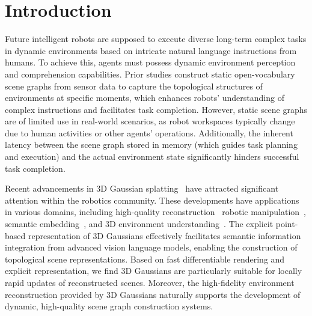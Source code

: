 \section{Introduction}  \label{sec:intro}

Future intelligent robots are supposed to execute diverse long-term complex tasks in dynamic environments based on intricate natural language instructions from humans. To achieve this, agents must possess dynamic environment perception and comprehension capabilities. Prior studies \cite{gu2023conceptgraphsopenvocabulary3dscene, werby23hovsg, yan2025dynamicopenvocabulary3dscene, linok2024barequeriesopenvocabularyobject} construct static open-vocabulary scene graphs from sensor data to capture the topological structures of environments at specific moments, which enhances robots' understanding of complex instructions and facilitates task completion. However, static scene graphs are of limited use in real-world scenarios, as robot workspaces typically change due to human activities or other agents' operations. Additionally, the inherent latency between the scene graph stored in memory (which guides task planning and execution) and the actual environment state significantly hinders successful task completion.

Recent advancements in 3D Gaussian splatting~\cite{kerbl20233d, Huang2DGS2024,yu2024mip,cheng2024gaussianpro} have attracted significant attention within the robotics community. These developments have applications in various domains, including high-quality reconstruction~\cite{kerbl20233d, Huang2DGS2024, keetha2024splatam, yan2024gs} robotic manipulation~\cite{zheng2024gaussiangrasper3dlanguagegaussian}, semantic embedding~\cite{ye2024gaussiangroupingsegmentedit, Li_2024}, and 3D environment understanding~\cite{qin2024langsplat3dlanguagegaussian,wu2024opengaussianpointlevel3dgaussianbased}. The explicit point-based representation of 3D Gaussians effectively facilitates semantic information integration from advanced vision language models, enabling the construction of topological scene representations. Based on fast differentiable rendering and explicit representation, we find 3D Gaussians are particularly suitable for locally rapid updates of reconstructed scenes. Moreover, the high-fidelity environment reconstruction provided by 3D Gaussians naturally supports the development of dynamic, high-quality scene graph construction systems.

